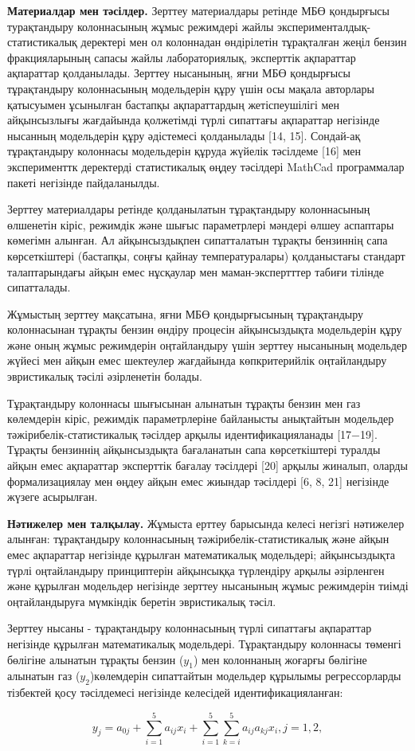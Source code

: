 \begin{multicols}{2}
{\bfseries Материалдар мен тәсілдер.} Зерттеу материалдары ретінде МБӨ
қондырғысы турақтандыру колоннасының жұмыс режимдері жайлы
эксперименталдық-статистикалық деректері мен ол колоннадан өндірілетін
тұрақталған жеңіл бензин фракцияларының сапасы жайлы лабораториялық,
эксперттік ақпараттар ақпараттар қолданылады. Зерттеу нысанының, яғни
МБӨ қондырғысы тұрақтандыру колоннасының модельдерін құру үшін осы
мақала авторлары қатысуымен ұсынылған бастапқы ақпараттардың
жетіспеушілігі мен айқынсызлығы жағдайында қолжетімді түрлі сипаттағы
ақпараттар негізінде нысанның модельдерін құру әдістемесі қолданылады
{[}14, 15{]}. Сондай-ақ тұрақтандыру колоннасы модельдерін құруда
жүйелік тәсілдеме {[}16{]} мен эксперименттк деректерді статистикалық
өңдеу тәсілдері MathCad программалар пакеті негізінде пайдаланылды.

Зерттеу материалдары ретінде қолданылатын тұрақтандыру колоннасының
өлшенетін кіріс, режимдік және шығыс параметрлері мәндері өлшеу
аспаптары көмегімн алынған. Ал айқынсыздықпен сипатталатын тұрақты
бензиннің сапа көрсеткіштері (бастапқы, соңғы қайнау температуралары)
қолданыстағы стандарт талаптарындағы айқын емес нұсқаулар мен
маман-экспертттер табиғи тілінде сипатталады.

Жұмыстың зерттеу мақсатына, яғни МБӨ қондырғысының тұрақтандыру
колоннасынан тұрақты бензин өндіру процесін айқынсыздықта модельдерін
құру және оның жұмыс режимдерін оңтайландыру үшін зерттеу нысанының
модельдер жүйесі мен айқын емес шектеулер жағдайында көпкритерийлік
оңтайландыру эвристикалық тәсілі әзірленетін болады.

Тұрақтандыру колоннасы шығысынан алынатын тұрақты бензин мен газ
көлемдерін кіріс, режимдік параметрлеріне байланысты анықтайтын
модельдер тәжірибелік-статистикалық тәсілдер арқылы идентификацияланады
{[}17−19{]}. Тұрақты бензиннің айқынсыздықта бағаланатын сапа
көрсеткіштері туралды айқын емес ақпараттар эксперттік бағалау тәсілдері
{[}20{]} арқылы жиналып, оларды формализациялау мен өңдеу айқын емес
жиындар тәсілдері {[}6, 8, 21{]} негізінде жүзеге асырылған.

{\bfseries Нәтижелер мен талқылау.} Жұмыста ерттеу барысында
келесі негізгі нәтижелер алынған: тұрақтандыру колоннасының
тәжірибелік-статистикалық және айқын емес ақпараттар негізінде құрылған
математикалық модельдері; айқынсыздықта түрлі оңтайландыру принциптерін
айқынсыққа түрлендіру арқылы әзірленген және құрылған модельдер
негізінде зерттеу нысанының жұмыс режимдерін тиімді оңтайландыруға
мүмкіндік беретін эвристикалық тәсіл.

Зерттеу нысаны - тұрақтандыру колоннасының түрлі сипаттағы ақпараттар
негізінде құрылған математикалық модельдері. Тұрақтандыру
колоннасы төменгі бөлігіне алынатын тұрақты бензин ($y_1$) мен колоннаның жоғарғы бөлігіне
алынатын газ ($y_2 $)көлемдерін сипаттайтын
модельдер құрылымы регрессорларды тізбектей қосу тәсілдемесі негізінде
келесідей идентификацияланған:
\end{multicols}
\begin{equation}
    y_j = a_{0j} + \sum_{i=1}^5 {a_{ij}x_{i} + \sum_{i=1}^5\sum_{k=i}^5 {a_{ij}}{a_{kj}x_i, j=1,2,}} 
\end{equation}	

